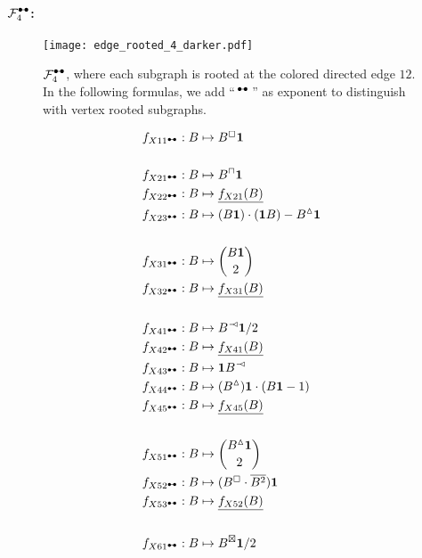 \documentclass{article}
\theoremstyle{plain}
\begin{document}
\paragraph{$\mathcal{F}_4^{\textcolor{black}{\bullet\!\!-\!\!\bullet}}$:}
\begin{figure}
\centering
\texttt{[image: edge\_rooted\_4\_darker.pdf]}
\caption{\label{F4e} $\mathcal{F}_4^{\textcolor{black}{\bullet\!\!-\!\!\bullet}}$, where each subgraph is rooted at the colored directed edge $12$. In the following formulas, we add ``$\,^{\textcolor{black}{\bullet\!\!-\!\!\bullet}}\,$'' as exponent to distinguish with vertex rooted subgraphs.}
\end{figure}
%
\begin{align*}
f_{X11^\dumbbell}: B&\mapsto B^\boxempty{\bf 1}\\
&\\%
f_{X21^\dumbbell}: B&\mapsto B^\sqcap{\bf 1}\\
f_{X22^\dumbbell}: B&\mapsto \underline{f_{X21}(B)}\\
f_{X23^\dumbbell}: B&\mapsto (B{\bf 1})\cdot ({\bf 1}B)-B^\vartriangle{\bf 1}\\
&\\%
f_{X31^\dumbbell}: B&\mapsto \binom{B{\bf 1}}{2}\\
f_{X32^\dumbbell}: B&\mapsto \underline{f_{X31}(B)}\\
&\\%
f_{X41^\dumbbell}: B&\mapsto B^\arro{\bf 1}/2\\
f_{X42^\dumbbell}: B&\mapsto \underline{f_{X41}(B)}\\
f_{X43^\dumbbell}: B&\mapsto {\bf 1}B^\arro\\
f_{X44^\dumbbell}: B&\mapsto (B^\vartriangle){\bf 1}\cdot(B{\bf 1}-1)\\
f_{X45^\dumbbell}: B&\mapsto \underline{f_{X45}(B)}\\
&\\%
f_{X51^\dumbbell}: B&\mapsto \binom{B^\vartriangle{\bf 1}}{2}\\
f_{X52^\dumbbell}: B&\mapsto (B^\boxempty\cdot \overline{B^2}){\bf 1}\\
f_{X53^\dumbbell}: B&\mapsto \underline{f_{X52}(B)}\\
&\\%
f_{X61^\dumbbell}: B&\mapsto B^\boxtimes{\bf 1}/2
\end{align*}
\end{document}
